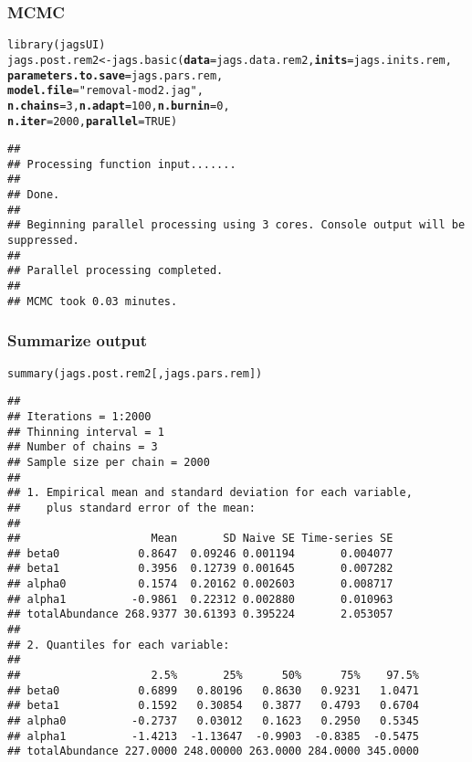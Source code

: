 \documentclass[color=usenames,dvipsnames]{beamer}\usepackage[]{graphicx}\usepackage[]{color}
\makeatletter
\newcommand{\hlnum}[1]{\textcolor[rgb]{0.69,0.494,0}{#1}}%
\newcommand{\hlstr}[1]{\textcolor[rgb]{0.749,0.012,0.012}{#1}}%
\newcommand{\hlstd}[1]{\textcolor[rgb]{0,0,0}{#1}}%
\newcommand{\hlkwb}[1]{\textcolor[rgb]{0,0.341,0.682}{#1}}%
\newcommand{\hlkwc}[1]{\textcolor[rgb]{0,0,0}{\textbf{#1}}}%
\newcommand{\hlkwd}[1]{\textcolor[rgb]{0.004,0.004,0.506}{#1}}%
\newenvironment{kframe}{%
 \def\at@end@of@kframe{}%
 \ifinner\ifhmode%
  \def\at@end@of@kframe{\end{minipage}}%
  \begin{minipage}{\columnwidth}%
 \fi\fi%
 \def\FrameCommand##1{\hskip\@totalleftmargin \hskip-\fboxsep
 \colorbox{shadecolor}{##1}\hskip-\fboxsep
     \hskip-\linewidth \hskip-\@totalleftmargin \hskip\columnwidth}%
 \MakeFramed {\advance\hsize-\width
   \@totalleftmargin\z@ \linewidth\hsize
   \@setminipage}}%
 {\par\unskip\endMakeFramed%
 \at@end@of@kframe}
\newenvironment{knitrout}{}{} %
\makeatother
\begin{document}
\begin{frame}[fragile]
  \frametitle{MCMC}
  \small
\begin{knitrout}\scriptsize
{}\color{fgcolor}\begin{kframe}
\begin{alltt}
\hlkwd{library}\hlstd{(jagsUI)}
\hlstd{jags.post.rem2} \hlkwb{<-} \hlkwd{jags.basic}\hlstd{(}\hlkwc{data}\hlstd{=jags.data.rem2,} \hlkwc{inits}\hlstd{=jags.inits.rem,}
                             \hlkwc{parameters.to.save}\hlstd{=jags.pars.rem,}
                             \hlkwc{model.file}\hlstd{=}\hlstr{"removal-mod2.jag"}\hlstd{,}
                             \hlkwc{n.chains}\hlstd{=}\hlnum{3}\hlstd{,} \hlkwc{n.adapt}\hlstd{=}\hlnum{100}\hlstd{,} \hlkwc{n.burnin}\hlstd{=}\hlnum{0}\hlstd{,}
                             \hlkwc{n.iter}\hlstd{=}\hlnum{2000}\hlstd{,} \hlkwc{parallel}\hlstd{=}\hlnum{TRUE}\hlstd{)}
\end{alltt}
\begin{verbatim}
## 
## Processing function input....... 
## 
## Done. 
##  
## Beginning parallel processing using 3 cores. Console output will be suppressed.
## 
## Parallel processing completed.
## 
## MCMC took 0.03 minutes.
\end{verbatim}
\end{kframe}
\end{knitrout}
\end{frame}



\begin{frame}[fragile]
  \frametitle{Summarize output}
\begin{knitrout}\tiny
{}\color{fgcolor}\begin{kframe}
\begin{alltt}
\hlkwd{summary}\hlstd{(jags.post.rem2[,jags.pars.rem])}
\end{alltt}
\begin{verbatim}
## 
## Iterations = 1:2000
## Thinning interval = 1 
## Number of chains = 3 
## Sample size per chain = 2000 
## 
## 1. Empirical mean and standard deviation for each variable,
##    plus standard error of the mean:
## 
##                    Mean       SD Naive SE Time-series SE
## beta0            0.8647  0.09246 0.001194       0.004077
## beta1            0.3956  0.12739 0.001645       0.007282
## alpha0           0.1574  0.20162 0.002603       0.008717
## alpha1          -0.9861  0.22312 0.002880       0.010963
## totalAbundance 268.9377 30.61393 0.395224       2.053057
## 
## 2. Quantiles for each variable:
## 
##                    2.5%       25%      50%      75%    97.5%
## beta0            0.6899   0.80196   0.8630   0.9231   1.0471
## beta1            0.1592   0.30854   0.3877   0.4793   0.6704
## alpha0          -0.2737   0.03012   0.1623   0.2950   0.5345
## alpha1          -1.4213  -1.13647  -0.9903  -0.8385  -0.5475
## totalAbundance 227.0000 248.00000 263.0000 284.0000 345.0000
\end{verbatim}
\end{kframe}
\end{knitrout}
\end{frame}
\end{document}
